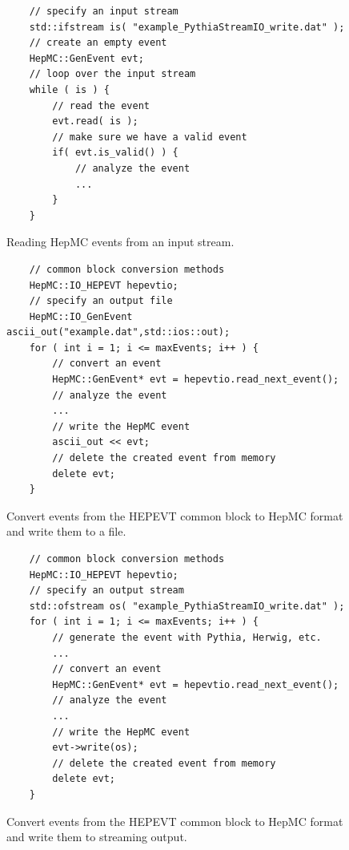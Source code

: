 \documentclass[11pt,letterpaper]{article}
\begin{document}
\begin{figure}[h]
\caption[Streaming input example]{\label{read_stream} 
           Reading HepMC events from an input stream. }
{\small \begin{verbatim}
    // specify an input stream
    std::ifstream is( "example_PythiaStreamIO_write.dat" );
    // create an empty event
    HepMC::GenEvent evt;
    // loop over the input stream
    while ( is ) {
        // read the event
        evt.read( is );
        // make sure we have a valid event
        if( evt.is_valid() ) {
            // analyze the event
            ...
        }
    }
\end{verbatim}}
\end{figure}

\begin{figure}[h]
\caption[IO\_HEPEVT and IO\_GenEvent example]
{\label{write_ascii} Convert events from the HEPEVT common block 
          to HepMC format and write them to a file. }
{\small \begin{verbatim}
    // common block conversion methods
    HepMC::IO_HEPEVT hepevtio;
    // specify an output file
    HepMC::IO_GenEvent ascii_out("example.dat",std::ios::out);
    for ( int i = 1; i <= maxEvents; i++ ) {
        // convert an event
        HepMC::GenEvent* evt = hepevtio.read_next_event();
        // analyze the event
        ...
        // write the HepMC event
        ascii_out << evt;
        // delete the created event from memory
        delete evt;
    }
    \end{verbatim}}
\end{figure}

\begin{figure}[h]
\caption[IO\_HEPEVT and streaming output example]
{\label{write_stream} Convert events from the HEPEVT common block 
          to HepMC format and write them to streaming output. }
    {\small \begin{verbatim}
    // common block conversion methods
    HepMC::IO_HEPEVT hepevtio;
    // specify an output stream
    std::ofstream os( "example_PythiaStreamIO_write.dat" );
    for ( int i = 1; i <= maxEvents; i++ ) {
        // generate the event with Pythia, Herwig, etc.
        ...
        // convert an event
        HepMC::GenEvent* evt = hepevtio.read_next_event();
        // analyze the event
        ...
        // write the HepMC event
        evt->write(os);
        // delete the created event from memory
        delete evt;
    }
\end{verbatim}}
\end{figure}
\end{document}
